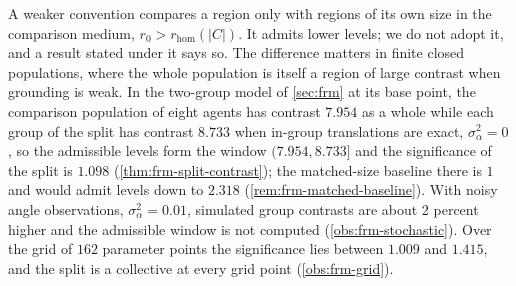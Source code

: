 \begin{remark}\label{rem:col-baseline-conventions}
A weaker convention compares a region only with regions of its own size in the comparison medium, $r_0>r_{\mathrm{hom}}(|C|)$. It admits lower levels; we do not adopt it, and a result stated under it says so. The difference matters in finite closed populations, where the whole population is itself a region of large contrast when grounding is weak. In the two-group model of \cref{sec:frm} at its base point, the comparison population of eight agents has contrast $7.954$ as a whole while each group of the split has contrast $8.733$ when in-group translations are exact, $\sigma_\alpha^2=0$, so the admissible levels form the window $(7.954,8.733]$ and the significance of the split is $1.098$ (\cref{thm:frm-split-contrast}); the matched-size baseline there is $1$ and would admit levels down to $2.318$ (\cref{rem:frm-matched-baseline}). With noisy angle observations, $\sigma_\alpha^2=0.01$, simulated group contrasts are about $2$ percent higher and the admissible window is not computed (\cref{obs:frm-stochastic}). Over the grid of $162$ parameter points the significance lies between $1.009$ and $1.415$, and the split is a collective at every grid point (\cref{obs:frm-grid}).
\end{remark}

